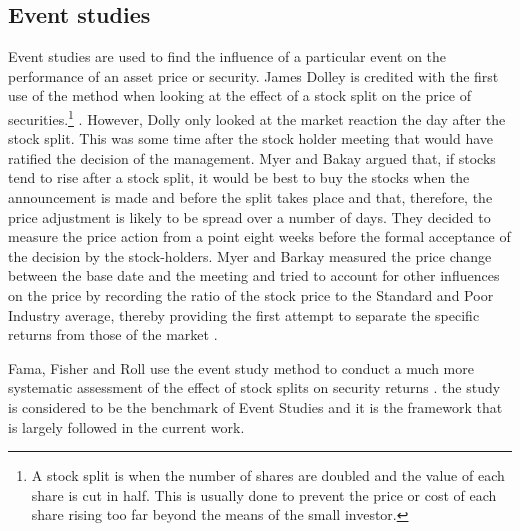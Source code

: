 \documentclass[12pt, a4paper, oneside]{article} %
\begin{document}
\subsection{Event studies}
Event studies are used to find the influence of a particular event on the performance of an asset price or security.  James Dolley is credited with the first use of the method when looking at the effect of a stock split on the price of securities.\footnote{A stock split is when the number of shares are doubled and the value of each share is cut in half.  This is usually done to prevent the price or cost of each share rising too far beyond the means of the small investor.} \citep{Dolly1933}. However, Dolly only looked at the market reaction the day after the stock split.  This was some time after the stock holder meeting that would have ratified the decision of the management. Myer and Bakay argued that, if stocks tend to rise after a stock split, it would be best to buy the stocks when the announcement is made and before the split takes place and that, therefore, the price adjustment is likely to be spread over a number of days.  They decided to measure the price action from a point eight weeks before the formal acceptance of the decision by the stock-holders. Myer and Barkay measured the price change between the base date and the meeting and tried to account for other influences on the price by recording the ratio of the stock price to the Standard and Poor Industry average, thereby providing the first attempt to separate the specific returns from those of the market \citep{MyersBakay}.

Fama, Fisher and Roll use the event study method to conduct a much more systematic assessment of the effect of stock splits on security returns \citep{FamaFisherJensenRoll}. the study is considered to be the benchmark of Event Studies and it is the framework that is largely followed in the current work.  
\end{document}
